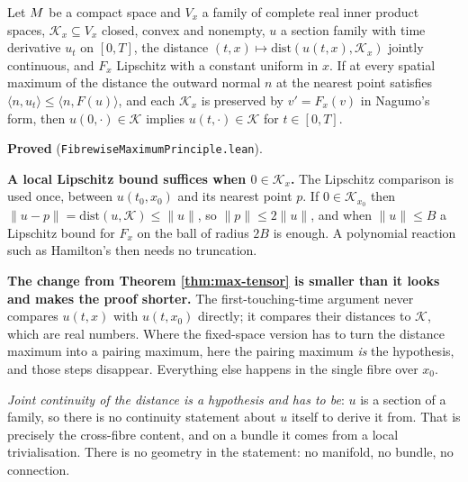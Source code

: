 \begin{theorem}
  \label{thm:max-fibrewise}
  \leanok
  Let $M$ be a compact space and $V_x$ a family of complete real inner product spaces,
  $\mathcal{K}_x \subseteq V_x$ closed, convex and nonempty, $u$ a section family with time
  derivative $u_t$ on $[0,T]$, the distance $(t,x)\mapsto \mathrm{dist}(u(t,x),\mathcal{K}_x)$
  jointly continuous, and $F_x$ Lipschitz with a constant uniform in $x$. If at every spatial
  maximum of the distance the outward normal $n$ at the nearest point satisfies
  $\langle n, u_t\rangle \le \langle n, F(u)\rangle$, and each $\mathcal{K}_x$ is preserved by
  $v' = F_x(v)$ in Nagumo's form, then $u(0,\cdot) \in \mathcal{K}$ implies
  $u(t,\cdot) \in \mathcal{K}$ for $t \in [0,T]$.

  \textbf{Proved} (\texttt{FibrewiseMaximumPrinciple.lean}).

  \textbf{A local Lipschitz bound suffices when $0 \in \mathcal{K}_x$.} The Lipschitz comparison
  is used once, between $u(t_0,x_0)$ and its nearest point $p$. If $0 \in \mathcal{K}_{x_0}$ then
  $\|u - p\| = \mathrm{dist}(u,\mathcal{K}) \le \|u\|$, so $\|p\| \le 2\|u\|$, and when
  $\|u\| \le B$ a Lipschitz bound for $F_x$ on the ball of radius $2B$ is enough. A polynomial
  reaction such as Hamilton's then needs no truncation.

  \textbf{The change from Theorem \ref{thm:max-tensor} is smaller than it looks and makes the
  proof shorter.} The first-touching-time argument never compares $u(t,x)$ with $u(t,x_0)$
  directly; it compares their distances to $\mathcal{K}$, which are real numbers. Where the
  fixed-space version has to turn the distance maximum into a pairing maximum, here the
  pairing maximum \emph{is} the hypothesis, and those steps disappear. Everything else happens
  in the single fibre over $x_0$.

  \emph{Joint continuity of the distance is a hypothesis and has to be}: $u$ is a section of a
  family, so there is no continuity statement about $u$ itself to derive it from. That is
  precisely the cross-fibre content, and on a bundle it comes from a local trivialisation.
  There is no geometry in the statement: no manifold, no bundle, no connection.
\end{theorem}

